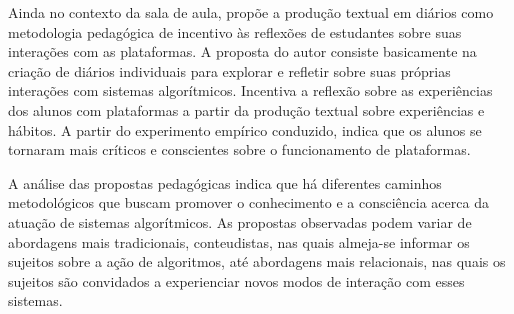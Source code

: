 Ainda no contexto da sala de aula, \textcite{Koenig2020} propõe a produção
textual em diários como metodologia pedagógica de incentivo às reflexões
de estudantes sobre suas interações com as plataformas. A proposta do
autor consiste basicamente na criação de diários individuais para
explorar e refletir sobre suas próprias interações com sistemas
algorítmicos. Incentiva a reflexão sobre as experiências dos alunos com
plataformas a partir da produção textual sobre experiências e hábitos. A
partir do experimento empírico conduzido, \textcite{Koenig2020} indica que os
alunos se tornaram mais críticos e conscientes sobre o funcionamento de
plataformas.

A análise das propostas pedagógicas indica que há diferentes caminhos
metodológicos que buscam promover o conhecimento e a consciência acerca
da atuação de sistemas algorítmicos. As propostas observadas podem
variar de abordagens mais tradicionais, conteudistas, nas quais
almeja-se informar os sujeitos sobre a ação de algoritmos, até
abordagens mais relacionais, nas quais os sujeitos são convidados a
experienciar novos modos de interação com esses sistemas.
